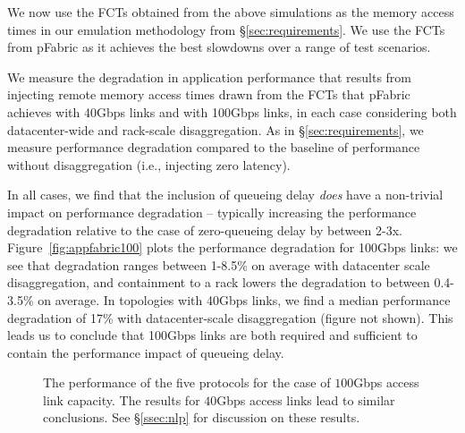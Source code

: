 We now use the FCTs obtained from the above simulations as the memory access times in our emulation methodology from \S\ref{sec:requirements}. We use the FCTs from pFabric as it achieves the best slowdowns over a range of test scenarios. 

We measure the degradation in application performance that results from injecting remote memory access times drawn from the FCTs that pFabric achieves with 40Gbps links and with 100Gbps links, in each case considering both datacenter-wide and rack-scale disaggregation. As in \S\ref{sec:requirements}, we measure performance degradation compared to the baseline of performance without disaggregation (i.e., injecting zero latency). 

In all cases, we find that the inclusion of queueing delay \emph{does} have a non-trivial impact on performance degradation -- typically increasing the performance degradation relative to the case of zero-queueing delay by between 2-3x. 
Figure~\ref{fig:appfabric100} plots the performance degradation for 100Gbps links: we see that degradation ranges between 1-8.5\% on average with datacenter scale disaggregation, and containment to a rack lowers the degradation to between 0.4-3.5\% on average. In topologies with 40Gbps links, we find a median performance degradation of 17\% with datacenter-scale disaggregation (figure not shown). 
This leads us to conclude that 100Gbps links are both required and sufficient to contain the performance impact of queueing delay.

\begin{figure}
  \centering
  \caption{\small{The performance of the five protocols for the case of $100$Gbps access link capacity. The results for $40$Gbps access links lead to similar conclusions. See \S\ref{ssec:nlp} for discussion on these results.}}
  \label{fig:phostp}
\end{figure}

